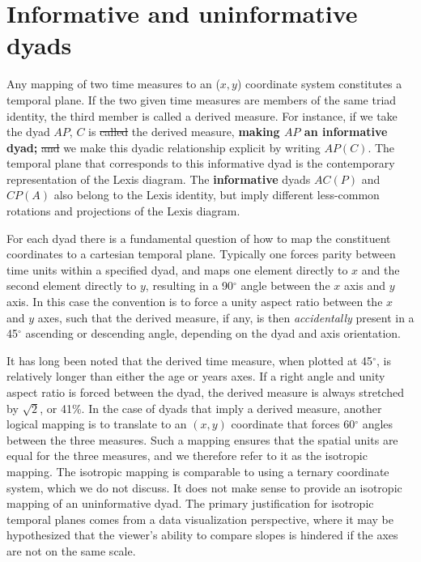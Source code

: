 \documentclass[11pt,oneside,a4paper]{article} %
\begin{document}
\FloatBarrier

\section*{Informative and uninformative dyads}

Any mapping of two time measures to an ($x,y$) coordinate
system constitutes a temporal plane. If the two given time measures are members of the same triad identity, the third member is called a derived
measure. For instance, if we take the dyad $AP$, $C$ is \sout{called }the derived
measure, \textbf{making $AP$ an informative dyad;} \sout{and }we make this dyadic relationship explicit by writing $AP(C)$. 
The temporal plane that corresponds to this informative dyad is the contemporary representation of the
Lexis diagram. The \textbf{informative }dyads $AC(P)$ and $CP(A)$ also belong to the Lexis identity, but imply different less-common rotations and projections of the Lexis
diagram. 

For each dyad there is a fundamental question of how to map the constituent
coordinates to a cartesian temporal plane. Typically one forces parity between time units within
a specified dyad, and maps one element directly to $x$ and the second element
directly to $y$, resulting in a 90$^\circ$ angle between the $x$ axis and $y$
axis. In this case the convention is to force a unity aspect ratio
between the $x$ and $y$ axes, such that the derived measure, if any, is then
\textit{accidentally} present in a 45$^\circ$ ascending or descending angle,
depending on the dyad and axis orientation. 

It has long been noted \citep{zeuner1869abhandlungen, perozzo1880della} that the
derived time measure, when plotted at 45$^\circ$, is relatively
longer than either the age or years axes. If a right angle and unity aspect
ratio is forced between the dyad, the derived measure is always stretched by
$\sqrt{2}$, or 41\%. In the case of dyads that imply a derived measure, another logical mapping is to translate to an $(x,y)$ coordinate that forces 60$^\circ$ angles between the three measures. Such a mapping ensures that the
spatial units are equal for the three measures, and we therefore refer to it as
the isotropic mapping. The isotropic mapping is comparable to using a ternary
coordinate system, which we do not discuss. It does not make sense to provide an isotropic mapping of an uninformative dyad. The primary justification for isotropic temporal planes comes from a data visualization perspective, where it may be
hypothesized that the viewer's ability to compare slopes is hindered if the axes
are not on the same scale.
\end{document}
